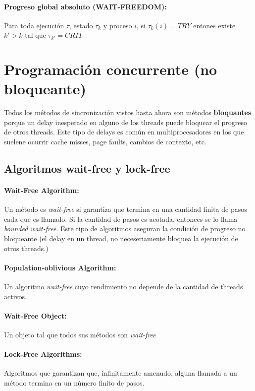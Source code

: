 \paragraph{Progreso global absoluto (WAIT-FREEDOM):} Para toda ejecución $\tau$, estado $\tau_{k}$ y proceso $i$, si $\tau_{k}(i) = TRY$ entones existe $k' > k$ tal que $\tau_{k'} = CRIT$

\printbibliography[keyword=sincro,title=Bibliografía]

\newpage
\section{Programación concurrente (no bloqueante)}
Todos los métodos de sincronización vistos hasta ahora son métodos \textbf{bloquantes} porque un delay inesperado en alguno de los threads puede bloquear el progreso de otros threads. Este tipo de delays es común en multiprocesadores en los que suelene ocurrir cache misses, page faults, cambios de contexto, etc.

\subsection{Algoritmos wait-free y lock-free}
\paragraph{Wait-Free Algorithm:} Un método es \textit{wait-free} si garantiza que termina en una cantidad finita de pasos cada que es llamado. Si la cantidad de pasos es acotada, entonces se lo llama \textit{bounded wait-free}. Este tipo de algoritmos aseguran la condición de progreso no bloqueante (el delay en un thread, no neceseriamente bloquea la ejecución de otros threads.)

\paragraph{Population-oblivious Algorithm:} Un algoritmo \textit{wait-free} cuyo rendimiento no depende de la cantidad de threads activos.

\paragraph{Wait-Free Object:} Un objeto tal que todos sus métodos son \textit{wait-free}

\paragraph{Lock-Free Algorithms:} Algoritmos que garantizan que, infinitamente amenudo, alguna llamada a un método termina en un número finito de pasos. 

